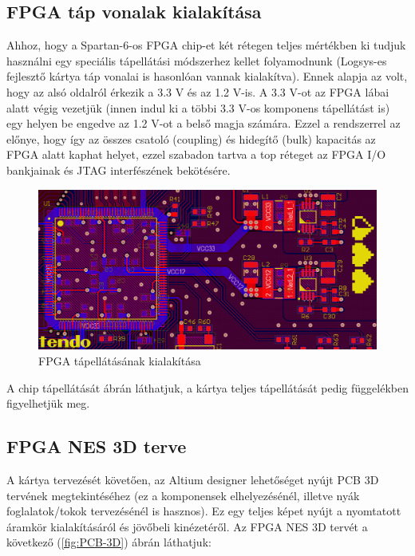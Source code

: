 	\subsection{FPGA táp vonalak kialakítása}
	
	Ahhoz, hogy a Spartan-6-os FPGA chip-et két rétegen teljes mértékben ki tudjuk használni egy speciális tápellátási módszerhez kellet folyamodnunk (Logsys-es fejlesztő kártya táp vonalai is hasonlóan vannak kialakítva). Ennek alapja az volt, hogy az alsó oldalról érkezik a 3.3 V és az 1.2 V-is. A 3.3 V-ot az FPGA lábai alatt végig vezetjük (innen indul ki a többi 3.3 V-os komponens tápellátást is) egy helyen be engedve az 1.2 V-ot a belső magja számára. Ezzel a rendszerrel az előnye, hogy így az összes csatoló (coupling) és hidegítő (bulk) kapacitás az FPGA alatt kaphat helyet, ezzel szabadon tartva a top réteget az FPGA I/O bankjainak és JTAG interfészének bekötésére.
	
	\begin{figure}[H]
		\centering
		\includegraphics[width=150mm, keepaspectratio]{figures/FPGA-PSU-routing}
		\caption{FPGA tápellátásának kialakítása}
		\label{fig:FPGA-PSU-routing}
	\end{figure}
	
	A chip tápellátását  ábrán láthatjuk, a kártya teljes tápellátását pedig  függelékben figyelhetjük meg. 
	
	\subsection{FPGA NES 3D terve}
	
	A kártya tervezését követően, az Altium designer lehetőséget nyújt PCB 3D tervének megtekintéséhez (ez a komponensek elhelyezésénél, illetve nyák foglalatok/tokok tervezésénél is hasznos). Ez egy teljes képet nyújt a nyomtatott áramkör kialakításáról és jövőbeli kinézetéről. Az FPGA NES 3D tervét a következő (\ref{fig:PCB-3D}) ábrán láthatjuk:  
	

